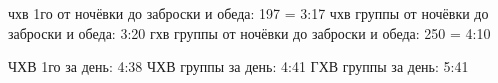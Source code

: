 










чхв 1го от ночёвки до заброски и обеда: 197 = 3:17
чхв группы от ночёвки до заброски и обеда: 3:20
гхв группы от ночёвки до заброски и обеда: 250 = 4:10


ЧХВ 1го за день: 4:38
ЧХВ группы за день: 4:41
ГХВ группы за день: 5:41

    \FloatBarrier
